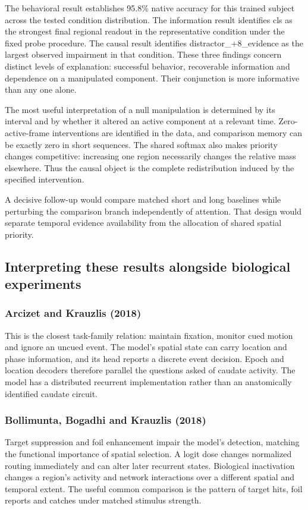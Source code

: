 \documentclass[11pt]{article}
\begin{document}
The behavioral result establishes 95.8\% native accuracy for this trained subject across the tested condition distribution. The information result identifies cls as the strongest final regional readout in the representative condition under the fixed probe procedure. The causal result identifies distractor\_\allowbreak{}+8\_\allowbreak{}evidence as the largest observed impairment in that condition. These three findings concern distinct levels of explanation: successful behavior, recoverable information and dependence on a manipulated component. Their conjunction is more informative than any one alone.

The most useful interpretation of a null manipulation is determined by its interval and by whether it altered an active component at a relevant time. Zero-active-frame interventions are identified in the data, and comparison memory can be exactly zero in short sequences. The shared softmax also makes priority changes competitive: increasing one region necessarily changes the relative mass elsewhere. Thus the causal object is the complete redistribution induced by the specified intervention.

A decisive follow-up would compare matched short and long baselines while perturbing the comparison branch independently of attention. That design would separate temporal evidence availability from the allocation of shared spatial priority.

\subsection{Interpreting these results alongside biological experiments}
\subsubsection{Arcizet and Krauzlis (2018)}
This is the closest task-family relation: maintain fixation, monitor cued motion and ignore an uncued event. The model’s spatial state can carry location and phase information, and its head reports a discrete event decision. Epoch and location decoders therefore parallel the questions asked of caudate activity. The model has a distributed recurrent implementation rather than an anatomically identified caudate circuit. \cite{bio_arcizet}

\subsubsection{Bollimunta, Bogadhi and Krauzlis (2018)}
Target suppression and foil enhancement impair the model’s detection, matching the functional importance of spatial selection. A logit dose changes normalized routing immediately and can alter later recurrent states. Biological inactivation changes a region’s activity and network interactions over a different spatial and temporal extent. The useful common comparison is the pattern of target hits, foil reports and catches under matched stimulus strength. \cite{bio_bollimunta}
\end{document}
